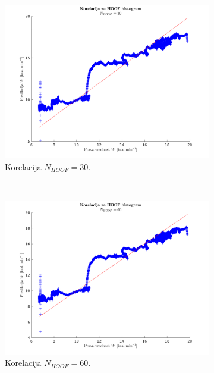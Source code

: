 \begin{figure}[htb]
	\centering
	\begin{subfigure}[t]{0.45\columnwidth}
		\includegraphics[width=\columnwidth]{./Slike/corr-hoof-30.png}
		\caption{Korelacija $N_{HOOF}=30$.}
		\label{fig:corr-hoof-30}
	\end{subfigure}
	~
	\begin{subfigure}[t]{0.45\columnwidth}
		\includegraphics[width=\columnwidth]{./Slike/corr-hoof-60.png}
		\caption{Korelacija $N_{HOOF}=60$.}
		\label{fig:corr-hoof-60}
	\end{subfigure}
	~
	\begin{subfigure}[b]{0.45\columnwidth}

\end{subfigure}
\end{figure}

